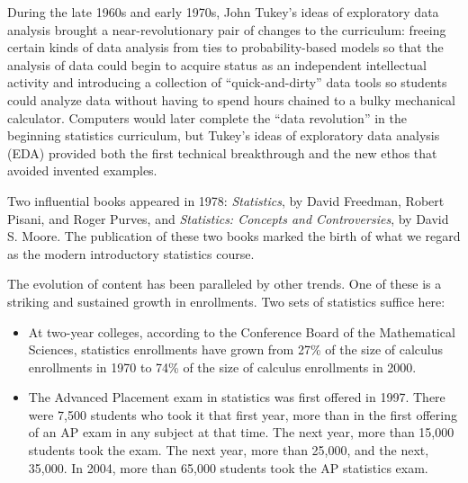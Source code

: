 During the late 1960s and early 1970s, John Tukey's ideas of exploratory data analysis brought a near-revolutionary pair of changes to the curriculum: freeing certain kinds of data analysis from ties to probability-based models so that the analysis of data could begin to acquire status as an independent intellectual activity and introducing a collection of ``quick-and-dirty'' data tools so students could analyze data without having to spend hours chained to a bulky mechanical calculator.  Computers would later complete the ``data revolution'' in the beginning statistics curriculum, but Tukey's ideas of exploratory data analysis (EDA) provided both the first technical breakthrough and the new ethos that avoided invented examples.  

Two influential books appeared in 1978:  \textit{Statistics}, by David Freedman, Robert Pisani, and Roger Purves, and \textit{Statistics: Concepts and Controversies}, by David S. Moore. The publication of these two books marked the birth of what we regard as the modern introductory statistics course.  

The evolution of content has been paralleled by other trends.  One of these is a striking and sustained growth in enrollments.  Two sets of statistics suffice here:  


\renewcommand\labelitemi{$\filledsquare$}
\begin{itemize}[leftmargin=1cm]
\item At two-year colleges, according to the Conference Board of the Mathematical Sciences, statistics enrollments have grown from 27\% of the size of calculus enrollments in 1970 to 74\% of the size of calculus enrollments in 2000.
\item The Advanced Placement exam in statistics was first offered in 1997.  There were 7,500 students who took it that first year, more than in the first offering of an AP exam in any subject at that time.  The next year, more than 15,000 students took the exam.  The next year, more than 25,000, and the next, 35,000.  In 2004, more than 65,000 students took the AP statistics exam.
\end{itemize}

